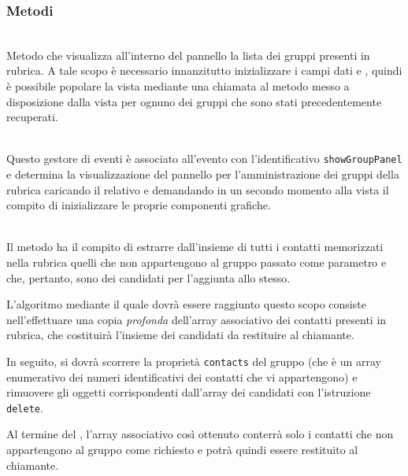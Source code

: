 \subsubsection*{Metodi}
\begin{description}

  \item{}\\
  Metodo che visualizza all'interno del pannello la lista dei gruppi presenti in rubrica. A tale scopo è necessario innanzitutto inizializzare i campi dati  e , quindi è possibile popolare la vista mediante una chiamata al metodo  messo a disposizione dalla vista per ognuno dei gruppi che sono stati precedentemente recuperati.
  
  \item{}\\
  Questo gestore di eventi è associato all'evento con l'identificativo \verb'showGroupPanel' e determina la visualizzazione del pannello per l'amministrazione dei gruppi della rubrica caricando il relativo  e demandando in un secondo momento alla vista il compito di inizializzare le proprie componenti grafiche.
  
  \item{}\\
  Il metodo ha il compito di estrarre dall'insieme di tutti i contatti memorizzati nella rubrica quelli che non appartengono al gruppo passato come parametro e che, pertanto, sono dei candidati per l'aggiunta allo stesso.
  
  L'algoritmo mediante il quale dovrà essere raggiunto questo scopo consiste nell'effettuare una copia \textit{profonda} dell'array associativo dei contatti presenti in rubrica, che costituirà l'insieme dei candidati da restituire al chiamante.
  
  In seguito, si dovrà scorrere la proprietà \verb'contacts' del gruppo (che è un array enumerativo dei numeri identificativi dei contatti che vi appartengono) e rimuovere gli oggetti corrispondenti dall'array dei candidati con l'istruzione \verb'delete'.
  
  Al termine del , l'array associativo così ottenuto conterrà solo i contatti che non appartengono al gruppo come richiesto e potrà quindi essere restituito al chiamante.

\end{description}



